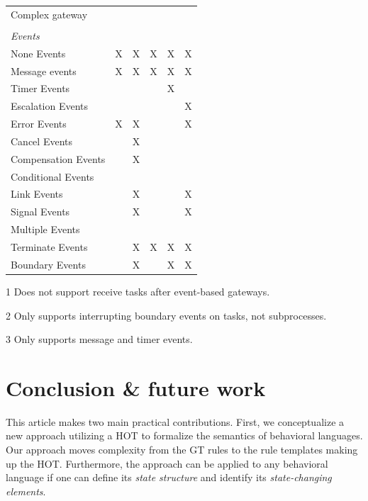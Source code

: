 \documentclass{lmcs} %
\begin{document}
\begin{table}[htbp]
\begin{threeparttable}
\begin{tabular}{l l l l l l}
      Complex gateway & & & & &\\
      \\
      \textit{Events} \\
      None Events & X & X & X & X & X\\
      Message events & X & X & X & X & X\\
      Timer Events & & & & X & \\
      Escalation Events & & & & & X\\
      Error Events & X & X & & & X\\
      Cancel Events & & X & & &\\
      Compensation Events & & X & & &\\
      Conditional Events & & & & &\\
      Link Events & & X & & & X\\
      Signal Events & & X & & & X\\
      Multiple Events & &  & & & \\
      Terminate Events & & X & X & X & X\\
      Boundary Events & & X\tnote{2} & & X\tnote{3} & X\\ %
    \end{tabular}
    \begin{tablenotes}
        \item[1] Does not support receive tasks after event-based gateways.
        \item[2] Only supports interrupting boundary events on tasks, not subprocesses.
        \item[3] Only supports message and timer events.
    \end{tablenotes}
    \end{threeparttable}
\end{table}


\section{Conclusion \& future work} \label{sec:conclusion}
This article makes two main practical contributions.
First, we conceptualize a new approach utilizing a HOT to formalize the semantics of behavioral languages.
Our approach moves complexity from the GT rules to the rule templates making up the HOT.
Furthermore, the approach can be applied to any behavioral language if one can define its \textit{state structure} and identify its \textit{state-changing elements}.
\end{document}
